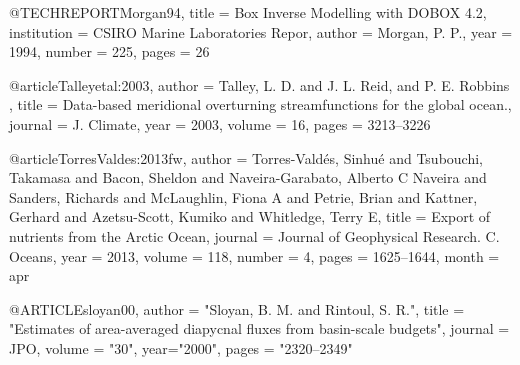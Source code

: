 @TECHREPORT{Morgan94,
   title = {Box Inverse Modelling with DOBOX 4.2},
   institution = {CSIRO Marine Laboratories Repor},
   author = {Morgan, P. P.},
   year = {1994},
   number = {225},
   pages = {26}
   }

@article{Talleyetal:2003,
author = {Talley, L. D. and J. L. Reid, and P. E. Robbins },
title = {{Data-based meridional overturning streamfunctions for the global ocean.}},
journal = {J. Climate},
year = {2003},
volume = {16},
pages = {3213--3226}
} 
 
@article{TorresValdes:2013fw,
author = {Torres-Vald{\'e}s, Sinhu{\'e} and Tsubouchi, Takamasa and Bacon, Sheldon and Naveira-Garabato, Alberto C Naveira and Sanders, Richards and McLaughlin, Fiona A and Petrie, Brian and Kattner, Gerhard and Azetsu-Scott, Kumiko and Whitledge, Terry E},
title = {{Export of nutrients from the Arctic Ocean}},
journal = {Journal of Geophysical Research. C. Oceans},
year = {2013},
volume = {118},
number = {4},
pages = {1625--1644},
month = apr
}

@ARTICLE{sloyan00,
author = "Sloyan, B. M. and Rintoul, S. R.",
title = "{Estimates of area-averaged diapycnal fluxes from basin-scale budgets}",
journal = JPO,
volume = "30",
year="2000",
pages = "2320--2349" }
